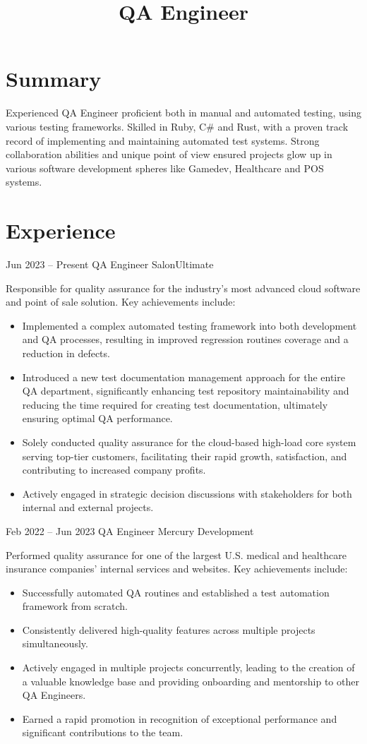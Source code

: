 \documentclass[11pt,a4paper,sans]{moderncv}
\title{QA Engineer}
\begin{document}
\makecvtitle
\vspace{-5mm}
\section{Summary}
Experienced QA Engineer proficient both in manual and automated testing, using various testing frameworks. Skilled in Ruby, C\# and Rust, with a proven track record of implementing and maintaining automated test systems. Strong collaboration abilities and unique point of view ensured projects glow up in various software development spheres like Gamedev, Healthcare and POS systems.

\section{Experience}

\cventry
{Jun 2023 -- Present}
{QA Engineer}
{SalonUltimate}
{}{}
{Responsible for quality assurance for the industry's most advanced cloud software and point of sale solution. Key achievements include:
\begin{itemize}
\item Implemented a complex automated testing framework into both development and QA processes, resulting in improved regression routines coverage and a reduction in defects.
\item Introduced a new test documentation management approach for the entire QA department, significantly enhancing test repository maintainability and reducing the time required for creating test documentation, ultimately ensuring optimal QA performance.
\item Solely conducted quality assurance for the cloud-based high-load core system serving top-tier customers, facilitating their rapid growth, satisfaction, and contributing to increased company profits.
\item Actively engaged in strategic decision discussions with stakeholders for both internal and external projects.
\end{itemize}}

\cventry
{Feb 2022 -- Jun 2023}
{QA Engineer}
{Mercury Development}
{}{}
{Performed quality assurance for one of the largest U.S. medical and healthcare insurance companies' internal services and websites. Key achievements include:
\begin{itemize}
\item Successfully automated QA routines and established a test automation framework from scratch.
\item Consistently delivered high-quality features across multiple projects simultaneously.
\item Actively engaged in multiple projects concurrently, leading to the creation of a valuable knowledge base and providing onboarding and mentorship to other QA Engineers.
\item Earned a rapid promotion in recognition of exceptional performance and significant contributions to the team.
\end{itemize}}
\end{document}
